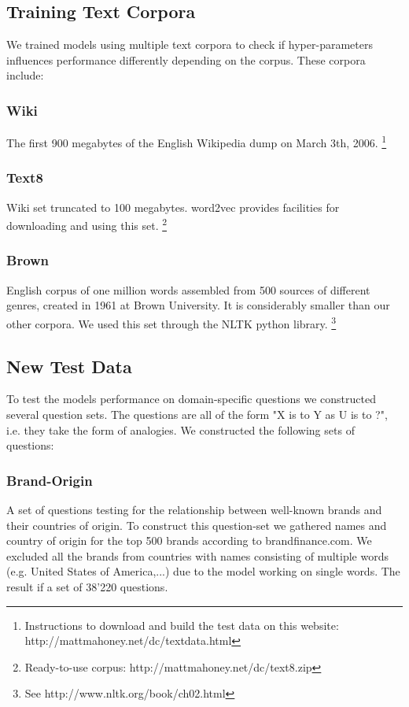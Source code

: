 \documentclass[conference]{IEEEtran}
\begin{document}
\subsection{Training Text Corpora}

We trained models using multiple text corpora to check if hyper-parameters influences performance differently depending on the corpus.
These corpora include:
\subsubsection{Wiki}
The first 900 megabytes of the English Wikipedia dump on March 3th, 2006. 
\footnote{Instructions to download and build the test data on this website: http://mattmahoney.net/dc/textdata.html}

\subsubsection{Text8}
Wiki set truncated to 100 megabytes. word2vec provides facilities for downloading and using this set.
\footnote{Ready-to-use corpus: http://mattmahoney.net/dc/text8.zip}

\subsubsection{Brown}
English corpus of one million words assembled from 500 sources of different genres, created in 1961 at Brown University. It is considerably smaller than our other corpora. We used this set through the NLTK python library. \footnote{See http://www.nltk.org/book/ch02.html}

\subsection{New Test Data}
To test the models performance on domain-specific questions we constructed several 
question sets. The questions are all of the form "X is to Y as U is to ?", i.e. they take the 
form of analogies. We constructed the following sets of questions:

\subsubsection{Brand-Origin}
A set of questions testing for the relationship between well-known brands and their countries
of origin. To construct this question-set we gathered names and country of origin for 
the top 500 brands according to brandfinance.com. We excluded all the brands from countries
with names consisting of multiple words (e.g. United States of America,...) due to the model 
working on single words. The result if a set of 38'220 questions.
\end{document}
